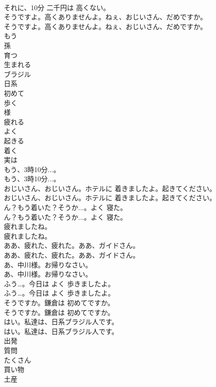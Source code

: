 \documentclass[8pt]{extreport}
\begin{document}
\begin{CJK}{UTF8}{min}
\\	それに、10分 二千円は 高くない。 
\\	そうですよ。高くありませんよ。ねぇ、おじいさん、だめですか。	
\\	そうですよ。高くありませんよ。ねぇ、おじいさん、だめですか。 
\\	もう
\\	孫
\\	育つ
\\	生まれる
\\	ブラジル
\\	日系
\\	初めて
\\	歩く
\\	様
\\	疲れる
\\	よく
\\	起きる
\\	着く
\\	実は
\\	もう、3時10分...。	
\\	もう、3時10分...。 
\\	おじいさん、おじいさん。ホテルに 着きましたよ。起きてください。	
\\	おじいさん、おじいさん。ホテルに 着きましたよ。起きてください。 
\\	ん？もう着いた？そうか...。よく 寝た。	
\\	ん？もう着いた？そうか...。よく 寝た。 
\\	疲れましたね。	
\\	疲れましたね。 
\\	ああ、疲れた、疲れた。ああ、ガイドさん。	
\\	ああ、疲れた、疲れた。ああ、ガイドさん。 
\\	あ、中川様。お帰りなさい。	
\\	あ、中川様。お帰りなさい。 
\\	ふう…。今日は よく 歩きましたよ。	
\\	ふう…。今日は よく 歩きましたよ。 
\\	そうですか。鎌倉は 初めてですか。	
\\	そうですか。鎌倉は 初めてですか。 
\\	はい。私達は、日系ブラジル人です。	
\\	はい。私達は、日系ブラジル人です。 
\\	出発
\\	質問
\\	たくさん
\\	買い物
\\	土産

\end{CJK}
\end{document}
